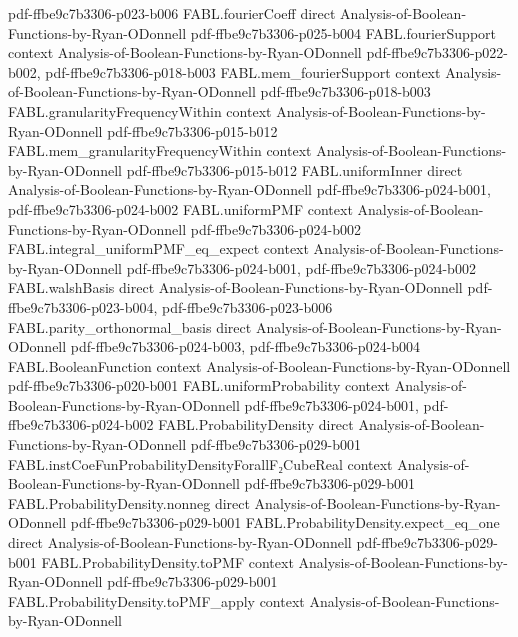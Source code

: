 \begin{theorem}
  {pdf-ffbe9c7b3306-p023-b006}
\proofstep
  {FABL.fourierCoeff}
  {direct}
  {Analysis-of-Boolean-Functions-by-Ryan-ODonnell}
  {pdf-ffbe9c7b3306-p025-b004}
\proofstep
  {FABL.fourierSupport}
  {context}
  {Analysis-of-Boolean-Functions-by-Ryan-ODonnell}
  {pdf-ffbe9c7b3306-p022-b002,
    pdf-ffbe9c7b3306-p018-b003}
\proofstep
  {FABL.mem_fourierSupport}
  {context}
  {Analysis-of-Boolean-Functions-by-Ryan-ODonnell}
  {pdf-ffbe9c7b3306-p018-b003}
\proofstep
  {FABL.granularityFrequencyWithin}
  {context}
  {Analysis-of-Boolean-Functions-by-Ryan-ODonnell}
  {pdf-ffbe9c7b3306-p015-b012}
\proofstep
  {FABL.mem_granularityFrequencyWithin}
  {context}
  {Analysis-of-Boolean-Functions-by-Ryan-ODonnell}
  {pdf-ffbe9c7b3306-p015-b012}
\proofstep
  {FABL.uniformInner}
  {direct}
  {Analysis-of-Boolean-Functions-by-Ryan-ODonnell}
  {pdf-ffbe9c7b3306-p024-b001,
    pdf-ffbe9c7b3306-p024-b002}
\proofstep
  {FABL.uniformPMF}
  {context}
  {Analysis-of-Boolean-Functions-by-Ryan-ODonnell}
  {pdf-ffbe9c7b3306-p024-b002}
\proofstep
  {FABL.integral_uniformPMF_eq_expect}
  {context}
  {Analysis-of-Boolean-Functions-by-Ryan-ODonnell}
  {pdf-ffbe9c7b3306-p024-b001,
    pdf-ffbe9c7b3306-p024-b002}
\proofstep
  {FABL.walshBasis}
  {direct}
  {Analysis-of-Boolean-Functions-by-Ryan-ODonnell}
  {pdf-ffbe9c7b3306-p023-b004,
    pdf-ffbe9c7b3306-p023-b006}
\proofstep
  {FABL.parity_orthonormal_basis}
  {direct}
  {Analysis-of-Boolean-Functions-by-Ryan-ODonnell}
  {pdf-ffbe9c7b3306-p024-b003,
    pdf-ffbe9c7b3306-p024-b004}
\proofstep
  {FABL.BooleanFunction}
  {context}
  {Analysis-of-Boolean-Functions-by-Ryan-ODonnell}
  {pdf-ffbe9c7b3306-p020-b001}
\proofstep
  {FABL.uniformProbability}
  {context}
  {Analysis-of-Boolean-Functions-by-Ryan-ODonnell}
  {pdf-ffbe9c7b3306-p024-b001,
    pdf-ffbe9c7b3306-p024-b002}
\proofstep
  {FABL.ProbabilityDensity}
  {direct}
  {Analysis-of-Boolean-Functions-by-Ryan-ODonnell}
  {pdf-ffbe9c7b3306-p029-b001}
\proofstep
  {FABL.instCoeFunProbabilityDensityForallF₂CubeReal}
  {context}
  {Analysis-of-Boolean-Functions-by-Ryan-ODonnell}
  {pdf-ffbe9c7b3306-p029-b001}
\proofstep
  {FABL.ProbabilityDensity.nonneg}
  {direct}
  {Analysis-of-Boolean-Functions-by-Ryan-ODonnell}
  {pdf-ffbe9c7b3306-p029-b001}
\proofstep
  {FABL.ProbabilityDensity.expect_eq_one}
  {direct}
  {Analysis-of-Boolean-Functions-by-Ryan-ODonnell}
  {pdf-ffbe9c7b3306-p029-b001}
\proofstep
  {FABL.ProbabilityDensity.toPMF}
  {context}
  {Analysis-of-Boolean-Functions-by-Ryan-ODonnell}
  {pdf-ffbe9c7b3306-p029-b001}
\proofstep
  {FABL.ProbabilityDensity.toPMF_apply}
  {context}
  {Analysis-of-Boolean-Functions-by-Ryan-ODonnell}

\end{theorem}
